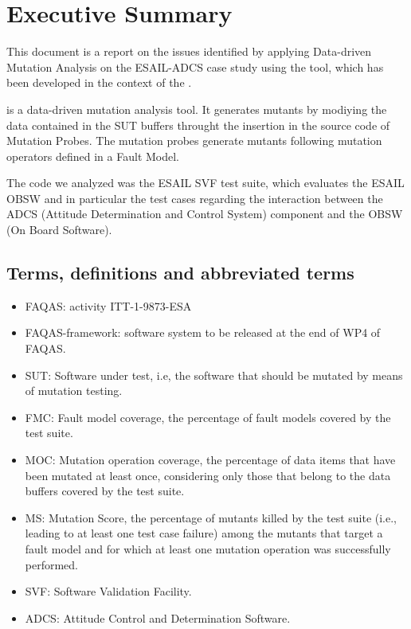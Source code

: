 
\chapter{Executive Summary}

This document is a report on the issues identified by applying Data-driven Mutation Analysis on the ESAIL-ADCS case study using the \DAMA tool, which has been developed in the context of the \FAQAS.

\DAMA is a data-driven mutation analysis tool. It generates mutants by modiying the data contained in the SUT buffers throught the insertion in the source code of Mutation Probes. The mutation probes generate mutants following mutation operators defined in a Fault Model.

The code we analyzed was the ESAIL SVF test suite, which evaluates the ESAIL OBSW and in particular the test cases regarding the interaction between the ADCS (Attitude Determination and Control System) component and the OBSW (On Board Software).


\section{Terms, definitions and abbreviated terms}

\begin{itemize}
\item{FAQAS}: activity ITT-1-9873-ESA
\item{FAQAS-framework}: software system to be released at the end of WP4 of FAQAS.
\item{SUT}: Software under test, i.e, the software that should be mutated by means of mutation testing.
\item{FMC}: Fault model coverage, the percentage of fault models covered by the test suite.
\item{MOC}: Mutation operation coverage, the percentage of data items that have been mutated at least once, considering only those that belong to the data buffers covered by the test suite.
\item{MS}: Mutation Score, the percentage of mutants killed by the test suite (i.e., leading to at least one test case failure) among the mutants that target a fault model and for which at least one mutation operation was successfully performed.
\item{SVF}: Software Validation Facility.
\item{ADCS}: Attitude Control and Determination Software.

\end{itemize}

\clearpage
